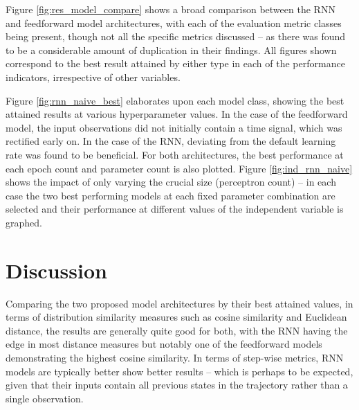 \documentclass{article}
\begin{document}
Figure \ref{fig:res_model_compare} shows a broad comparison between the RNN and feedforward model architectures, with each of the evaluation metric classes being present, though not all the specific metrics discussed -- as there was found to be a considerable amount of duplication in their findings. All figures shown correspond to the best result attained by either type in each of the performance indicators, irrespective of other variables. 

Figure \ref{fig:rnn_naive_best} elaborates upon each model class, showing the best attained results at various hyperparameter values. In the case of the feedforward model, the input observations did not initially contain a time signal, which was rectified early on. In the case of the RNN, deviating from the default learning rate was found to be beneficial. For both architectures, the best performance at each epoch count and parameter count is also plotted. Figure \ref{fig:ind_rnn_naive} shows the impact of only varying the crucial size (perceptron count) -- in each case the two best performing models at each fixed parameter combination are selected and their performance at different values of the independent variable is graphed. 

\section{Discussion}
\label{sec:discussion}

Comparing the two proposed model architectures by their best attained values, in terms of distribution similarity measures such as cosine similarity and Euclidean distance, the results are generally quite good for both, with the RNN having the edge in most distance measures but notably one of the feedforward models demonstrating the highest cosine similarity. In terms of step-wise metrics, RNN models are typically better show better results -- which is perhaps to be expected, given that their inputs contain all previous states in the trajectory rather than a single observation. 
\end{document}
